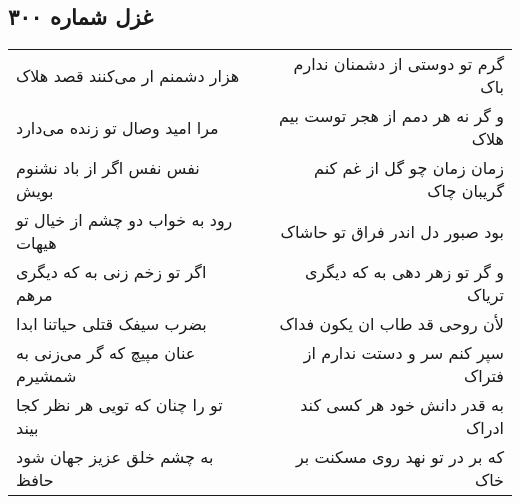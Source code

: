 \begin{center}
\section*{غزل شماره ۳۰۰}
\label{sec:sh300}
\begin{longtable}{l p{0.5cm} r}
هزار دشمنم ار می‌کنند قصد هلاک
&&
گرم تو دوستی از دشمنان ندارم باک
\\
مرا امید وصال تو زنده می‌دارد
&&
و گر نه هر دمم از هجر توست بیم هلاک
\\
نفس نفس اگر از باد نشنوم بویش
&&
زمان زمان چو گل از غم کنم گریبان چاک
\\
رود به خواب دو چشم از خیال تو هیهات
&&
بود صبور دل اندر فراق تو حاشاک
\\
اگر تو زخم زنی به که دیگری مرهم
&&
و گر تو زهر دهی به که دیگری تریاک
\\
بضرب سیفک قتلی حیاتنا ابدا
&&
لأن روحی قد طاب ان یکون فداک
\\
عنان مپیچ که گر می‌زنی به شمشیرم
&&
سپر کنم سر و دستت ندارم از فتراک
\\
تو را چنان که تویی هر نظر کجا بیند
&&
به قدر دانش خود هر کسی کند ادراک
\\
به چشم خلق عزیز جهان شود حافظ
&&
که بر در تو نهد روی مسکنت بر خاک
\\
\end{longtable}
\end{center}
